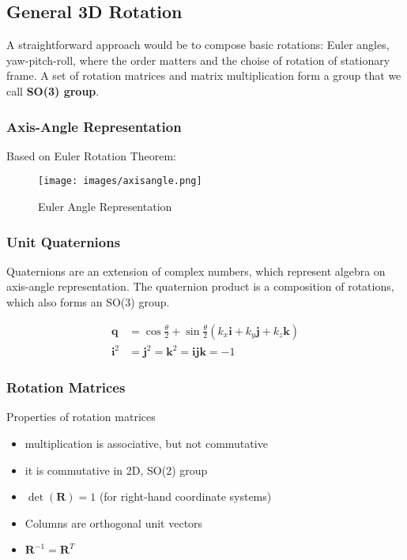 \newpage
\subsection{General 3D Rotation}

A straightforward approach would be to compose basic rotations: Euler angles, yaw-pitch-roll, where the order matters and the choise of rotation of stationary frame.
A set of rotation matrices and matrix multiplication form a group that we call \textbf{SO(3) group}.\\

\subsubsection{Axis-Angle Representation}
Based on Euler Rotation Theorem:

\begin{figure}[H]
  \begin{center}
    \texttt{[image: images/axisangle.png]}
  \end{center}
  \caption{Euler Angle Representation}\label{fig:Euler Angles}
\end{figure}

\subsubsection{Unit Quaternions}
Quaternions are an extension of complex numbers, which represent algebra on axis-angle representation.
The quaternion product is a composition of rotations, which also forms an SO(3) group.

\begin{align*}
  \mathbf{q} &= \cos \frac{\theta}{2} + \sin \frac{\theta}{2} (k_x \mathbf{i} + k_y \mathbf{j} + k_z \mathbf{k}) \\
  \mathbf{i}^2 &= \mathbf{j}^2 = \mathbf{k}^2 = \mathbf{ijk} = -1
\end{align*}

\subsubsection{Rotation Matrices}
Properties of rotation matrices
\begin{itemize}
  \item multiplication is associative, but not commutative
  \item it is commutative in 2D, SO(2) group
  \item $\det (\mathbf{R}) = 1$ (for right-hand coordinate systems)
  \item Columns are orthogonal unit vectors
  \item $\mathbf{R}^{-1} = \mathbf{R}^T$
\end{itemize}

